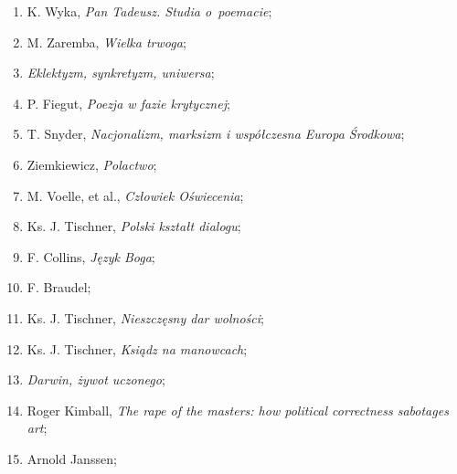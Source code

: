 \documentclass[a4paper,11pt]{article}
\begin{document}
\begin{enumerate}
\item K. Wyka, \textit{Pan Tadeusz. Studia o~poemacie};



\item M. Zaremba, \textit{Wielka trwoga};



\item \textit{Eklektyzm, synkretyzm, uniwersa};



\item P. Fiegut, \textit{Poezja w fazie krytycznej};



\item T. Snyder, \textit{Nacjonalizm, marksizm i współczesna Europa
    Środkowa};



\item Ziemkiewicz, \textit{Polactwo};



\item M. Voelle, et al., \textit{Człowiek Oświecenia};



\item Ks. J. Tischner, \textit{Polski kształt dialogu};



\item F. Collins, \textit{Język Boga};



\item F. Braudel;



\item Ks. J. Tischner, \textit{Nieszczęsny dar wolności};



\item Ks. J. Tischner, \textit{Ksiądz na manowcach};



\item \textit{Darwin, żywot uczonego};



\item Roger Kimball, \textit{The rape of the masters: how political
    correctness sabotages art};



\item Arnold Janssen;




\end{enumerate}
\end{document}
